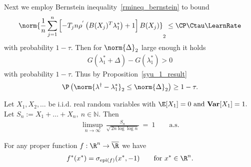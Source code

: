 Next we employ Bernstein inequality~\ref{rmineq_bernstein} to bound
\begin{align}
    \norm{
      \frac{1}{n}
      \sum_{j = 1}^{n} 
      \left[ 
        -T_j n 
        \rho^{'} 
        \left( 
          B(X_j)^T \lambda^*_1
        \right)
      +
      1
      \right]
      B(X_j)
    }_2
    \le
    \CP \Ctau \LearnRate
\end{align}
with probability $1 - \tau$.
Then for 
$\norm{\Delta}_2$ large enough it holds
\begin{gather}
  G(\lambda^*_1 + \Delta) 
  -
  G(\lambda^*_1)
  >
  0
\end{gather}
with probability $1 - \tau$.
Thus by Proposition~\ref{syu_1_result}
  \begin{gather}
    \P
    \left( 
      \norm{
        \lambda^\dagger
        -
        \lambda^*_1
      }_2
      \le
      \norm{\Delta}_2
    \right)
    \ge 
    1 - \tau
    .
  \end{gather}
\begin{theorem*}
  Let 
  $
    X_1,
    X_2,
    \ldots
  $
  be i.i.d. real random variables with 
  $
    \E[X_1]=0
    \ 
    \text{and}
    \ 
    \mathbf{Var}
    [X_1]
    = 1.
  $
  Let
  $
    S_n
    :=
    X_1
    +
    \ldots
    +
    X_n,
    \ 
    n\in \mathbb{N}
    .
  $
  Then
  \begin{gather}
    \limsup_{n\to\infty}
    \,
    \frac{S_n}{
      \sqrt{
        \,
        2n
        \log
        \log
        n
      }
    }
    \ 
    =
    \ 
    1
    \qquad
    \text{a.s.}
  \end{gather}
\end{theorem*}
\begin{lemma}
  For any proper function
  $
    f:\R^n\to\overline{\R}
  $
  we have
  \begin{gather}
    f^*(x^*) 
    =
    \sigma_{\mathrm{epi}(f)}
    (x^*,-1)
    \qquad
    \text{for}
    \ 
    x^* \in \R^n.
  \end{gather}
\end{lemma}
